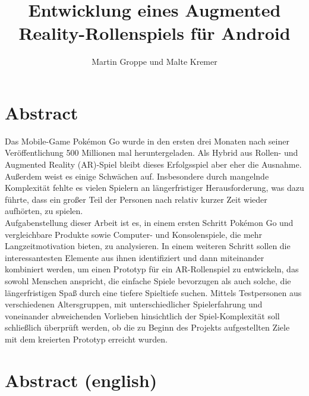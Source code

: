 \documentclass[extern,palatino]{cgBA}
\author{Martin Groppe und Malte Kremer}
\title{Entwicklung eines Augmented Reality-Rollenspiels für Android}
\begin{document}
	
	
	
	\maketitle
	
	\newpage
	
	\tableofcontents
	\clearpage         %
	
	
\section{Abstract}
	
Das Mobile-Game Pokémon Go wurde in den ersten drei Monaten nach seiner Veröffentlichung 500 Millionen mal heruntergeladen. Als Hybrid aus Rollen- und Augmented Reality (AR)-Spiel bleibt dieses Erfolgsspiel aber eher die Ausnahme. Außerdem weist es einige Schwächen auf. Insbesondere durch mangelnde Komplexität fehlte es vielen Spielern an längerfristiger Herausforderung, was dazu führte, dass ein großer Teil der Personen nach relativ kurzer Zeit wieder aufhörten, zu spielen.  
\\Aufgabenstellung dieser Arbeit ist es, in einem ersten Schritt Pokémon Go und vergleichbare Produkte sowie Computer- und Konsolenspiele, die mehr Langzeitmotivation bieten, zu analysieren. In einem weiteren Schritt sollen die interessantesten Elemente aus ihnen identifiziert und dann miteinander kombiniert werden, um einen Prototyp für ein AR-Rollenspiel zu entwickeln, das sowohl Menschen anspricht, die einfache Spiele bevorzugen als auch solche, die längerfristigen Spaß durch eine tiefere Spieltiefe suchen. Mittels Testpersonen aus verschiedenen Altersgruppen, mit unterschiedlicher Spielerfahrung und voneinander abweichenden Vorlieben hinsichtlich der Spiel-Komplexität soll schließlich überprüft werden, ob die zu Beginn des Projekts aufgestellten Ziele mit dem kreierten Prototyp erreicht wurden.
\section{Abstract (english)}
\end{document}
